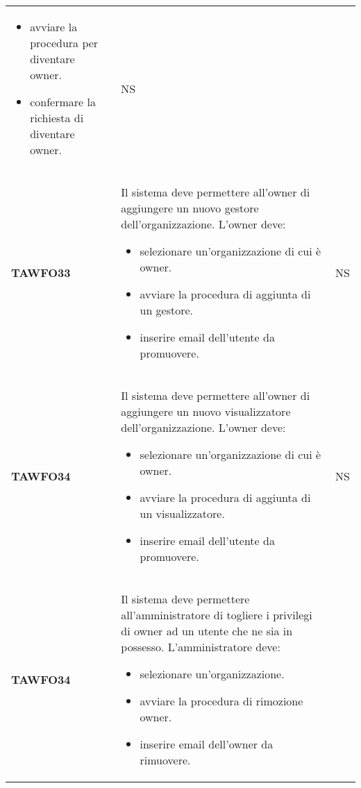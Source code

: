 \documentclass[../piano-di-qualifica.tex]{subfiles}
\begin{document}
\begin{centering}
\begin{longtable}[H]{>{\centering\bfseries}m{3cm} >{}p{10cm} >{\centering\arraybackslash}m{3cm}}
                          \begin{itemize}
                            \item avviare la procedura per diventare owner.
                            \item confermare la richiesta di diventare owner.
                          \end{itemize}
                      & NS \\
        TAWFO33       & Il sistema deve permettere all'owner di aggiungere un nuovo gestore dell'organizzazione. \newline
                        L'owner deve:
                          \begin{itemize}
                            \item selezionare un'organizzazione di cui è owner.
                            \item avviare la procedura di aggiunta di un gestore.
                            \item inserire email dell'utente da promuovere.
                          \end{itemize}
                      & NS \\
        TAWFO34       & Il sistema deve permettere all'owner di aggiungere un nuovo visualizzatore dell'organizzazione. \newline
                        L'owner deve:
                          \begin{itemize}
                            \item selezionare un'organizzazione di cui è owner.
                            \item avviare la procedura di aggiunta di un visualizzatore.
                            \item inserire email dell'utente da promuovere.
                          \end{itemize}
                      & NS \\
        TAWFO34       & Il sistema deve permettere all'amministratore di togliere i privilegi di owner ad un utente che ne sia in possesso. \newline
                        L'amministratore deve:
                          \begin{itemize}
                            \item selezionare un'organizzazione.
                            \item avviare la procedura di rimozione owner.
                            \item inserire email dell'owner da rimuovere.

\end{itemize}
\end{longtable}
\end{centering}
\end{document}
